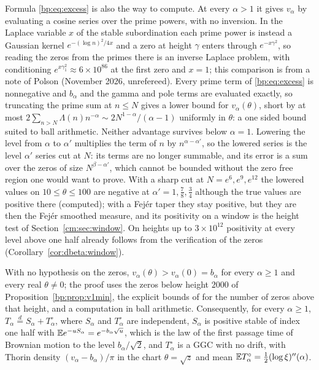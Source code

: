 \begin{remark}\label{bp:rem:compute}
Formula \eqref{bp:eq:excess} is also the way to compute. At every $\alpha>1$ it gives $v_\alpha$ by evaluating a cosine series over the prime powers, with no inversion. In the Laplace variable $x$ of the stable subordination each prime power is instead a Gaussian kernel $e^{-(\log n)^2/4x}$ and a zero at height $\gamma$ enters through $e^{-x\gamma^2}$, so reading the zeros from the primes there is an inverse Laplace problem, with conditioning $e^{x\gamma_1^2}\approx6\times10^{86}$ at the first zero and $x=1$; this comparison is from a note of Polson (November 2026, unrefereed). Every prime term of \eqref{bp:eq:excess} is nonnegative and $b_\alpha$ and the gamma and pole terms are evaluated exactly, so truncating the prime sum at $n\le N$ gives a lower bound for $v_\alpha(\theta)$, short by at most $2\sum_{n>N}\Lambda(n)n^{-\alpha}\sim2N^{1-\alpha}/(\alpha-1)$ uniformly in $\theta$: a one sided bound suited to ball arithmetic. Neither advantage survives below $\alpha=1$. Lowering the level from $\alpha$ to $\alpha'$ multiplies the term of $n$ by $n^{\alpha-\alpha'}$, so the lowered series is the level $\alpha'$ series cut at $N$: its terms are no longer summable, and its error is a sum over the zeros of size $N^{\beta-\alpha'}$, which cannot be bounded without the zero free region one would want to prove. With a sharp cut at $N=e^{6},e^{9},e^{12}$ the lowered values on $10\le\theta\le100$ are negative at $\alpha'=1,\frac78,\frac34$ although the true values are positive there (computed); with a Fej\'er taper they stay positive, but they are then the Fej\'er smoothed measure, and its positivity on a window is the height test of Section~\ref{cm:sec:window}. On heights up to $3\times10^{12}$ positivity at every level above one half already follows from the verification of the zeros (Corollary~\ref{cor:dbeta:window}).
\end{remark}

\begin{proposition}\label{bp:prop:valpha}
With no hypothesis on the zeros, $v_\alpha(\theta)>v_\alpha(0)=b_\alpha$ for every $\alpha\ge1$ and every real $\theta\ne0$; the proof uses the zeros below height $2000$ of Proposition~\ref{bp:prop:v1min}, the explicit bounds of \cite{HSW22} for the number of zeros above that height, and a computation in ball arithmetic. Consequently, for every $\alpha\ge1$, $T_\alpha\stackrel d=S_\alpha+T_\alpha^\circ$, where $S_\alpha$ and $T_\alpha^\circ$ are independent, $S_\alpha$ is positive stable of index one half with $\mathbb{E} e^{-uS_\alpha}=e^{-b_\alpha\sqrt u}$, which is the law of the first passage time of Brownian motion to the level $b_\alpha/\sqrt2$, and $T_\alpha^\circ$ is a GGC with no drift, with Thorin density $(v_\alpha-b_\alpha)/\pi$ in the chart $\theta=\sqrt z$ and mean $\mathbb{E} T_\alpha^\circ=\frac12(\log\xi)''(\alpha)$.
\end{proposition}

